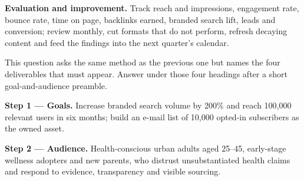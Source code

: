 \begin{qlist}
\begin{apts}
\item \textbf{Evaluation and improvement.} Track reach and impressions,
      engagement rate, bounce rate, time on page, backlinks earned, branded
      search lift, leads and conversion; review monthly, cut formats that do not
      perform, refresh decaying content and feed the findings into the next
      quarter's calendar.
\end{apts}

This question asks the same method as the previous one but names the four
deliverables that must appear. Answer under those four headings after a short
goal-and-audience preamble.

\textbf{Step 1 --- Goals.} Increase branded search volume by 200\% and reach
100{,}000 relevant users in six months; build an e-mail list of 10{,}000
opted-in subscribers as the owned asset.

\textbf{Step 2 --- Audience.} Health-conscious urban adults aged 25--45,
early-stage wellness adopters and new parents, who distrust unsubstantiated
health claims and respond to evidence, transparency and visible sourcing.


\end{qlist}
